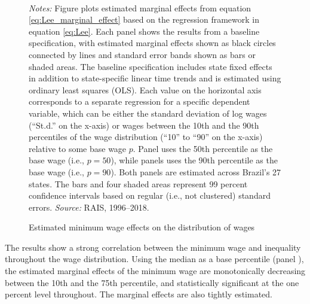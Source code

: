 \begin{figure}[!htb]
  \centering
  \caption{\label{fig:Lee_regression}Estimated minimum wage effects on the distribution of wages}
  \prefigvspace
  \hspace*{\fill}%
  \centerhfill[\qquad\qquad\qquad\qquad\qquad]
  \hspace*{\fill}
  \\
  \postfigvspace
  \begin{minipage}[t]{1\columnwidth}%
    \begin{spacing}{0.75}
      \emph{\scriptsize{}Notes:}{\scriptsize{} Figure plots estimated marginal effects from equation \eqref{eq:Lee_marginal_effect} based on the regression framework in equation \eqref{eq:Lee}. Each panel shows the results from a baseline specification, with estimated marginal effects shown as black circles connected by lines and standard error bands shown as bars or shaded areas. The baseline specification includes state fixed effects in addition to state-specific linear time trends and is estimated using ordinary least squares (OLS). Each value on the horizontal axis corresponds to a separate regression for a specific dependent variable, which can be either the standard deviation of log wages (``St.d.'' on the x-axis) or wages between the 10th and the 90th percentiles of the wage distribution (``10'' to ``90'' on the x-axis) relative to some base wage $p$. Panel  uses the 50th percentile as the base wage (i.e., $p=50$), while panels  uses the 90th percentile as the base wage (i.e., $p=90$). Both panels are estimated across Brazil's 27 states. The bars and four shaded areas represent 99 percent confidence intervals based on regular (i.e., not clustered) standard errors. %
      \emph{\scriptsize{}Source: } RAIS, 1996--2018.}
    \end{spacing}
  \end{minipage}
\end{figure}


The results show a strong correlation between the minimum wage and inequality throughout the wage distribution. Using the median as a base percentile (panel ), the estimated marginal effects of the minimum wage are monotonically decreasing between the 10th and the 75th percentile, and statistically significant at the one percent level throughout. The marginal effects are also tightly estimated.


